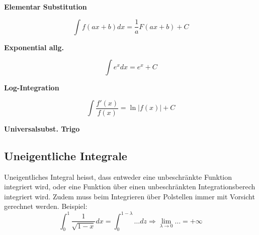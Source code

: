 \begin{center}
	\begin{minipage}{0.2\textwidth}
		\noindent\textbf{Elementar Substitution}
	\end{minipage}%
	\begin{minipage}{0.3\textwidth}
		\[\int f(ax + b)dx = \frac{1}{a}F(ax+b)+C\]
	\end{minipage}
\end{center}

\begin{center}
	\begin{minipage}{0.2\textwidth}
		\noindent\textbf{Exponential allg.}
	\end{minipage}%
	\begin{minipage}{0.3\textwidth}
		\[\int e^xdx = e^x + C\]
	\end{minipage}
\end{center}

\begin{center}
	\begin{minipage}{0.2\textwidth}
		\noindent\textbf{Log-Integration}
	\end{minipage}%
	\begin{minipage}{0.3\textwidth}
		\[\int \frac{f'(x)}{f(x)} = \ln\left|f(x)\right| + C\]
	\end{minipage}
\end{center}

\begin{center}
	\begin{minipage}{0.2\textwidth}
		\noindent\textbf{Universalsubst. Trigo}
	\end{minipage}%
	\begin{minipage}{0.3\textwidth}
		 \begin{flushright}
		 \end{flushright}
	\end{minipage}
\end{center} 

\subsection{Uneigentliche Integrale}
Uneigentliches Integral heisst, dass entweder eine unbeschränkte Funktion integriert wird, oder eine Funktion über einen unbeschränkten Integrationsberech integriert wird. Zudem muss beim Integrieren über Polstellen immer mit Vorsicht gerechnet werden. Beispiel: 
\[\int_{0}^{1}\frac{1}{\sqrt{1-x}}dx = \int_{0}^{1-\lambda}\dots dz \Rightarrow \lim\limits_{\lambda \rightarrow 0}\dots = +\infty\]

